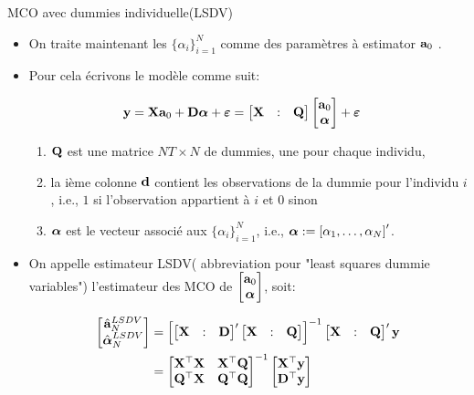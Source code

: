 \begin{frame}[allowframebreaks]{MCO avec dummies individuelle(LSDV)}
\begin{itemize}
\item On traite maintenant les $\{\alpha_i\}_{i=1}^N$ comme des paramètres à estimator ${\mathbf a}_0$ .

\item Pour cela écrivons le modèle comme suit:

\begin{align*}
{\mathbf y} &= \mathbf X{\mathbf a}_0 + \mathbf D {\boldsymbol \alpha}  + {\boldsymbol \varepsilon} =  
\begin{bmatrix}
\mathbf X&:&  \mathbf Q
\end{bmatrix}
\begin{bmatrix}
{\mathbf a}_0\\
{\boldsymbol \alpha}
\end{bmatrix} + {\boldsymbol \varepsilon}
\end{align*}
\begin{enumerate}[$\star$]
    \item $\mathbf Q$ est une matrice $N T\times N$ de dummies, une pour chaque individu,
    \item la ième colonne ${\mathbf d}$ contient les observations de la dummie pour l'individu $i$, 
    i.e., $1$ si l'observation appartient à $i$ et $0$ sinon
    \item  ${\boldsymbol \alpha}$ est le vecteur associé aux 
    $\{\alpha_i\}_{i=1}^N$, i.e., ${\boldsymbol \alpha}:=\left[\alpha_1, \ldots, \alpha_N\right]^\prime$.
\end{enumerate}
\item On appelle estimateur  LSDV( abbreviation pour "least squares dummie variables")
 l'estimateur des MCO de
$\begin{bmatrix}
{\mathbf a}_0\\
{\boldsymbol \alpha}
\end{bmatrix}$, soit:

\begin{align*}
    \begin{bmatrix}
    \hat{{\mathbf a}}^{LSDV}_N\\
    \hat{{\boldsymbol \alpha}}^{LSDV}_N
    \end{bmatrix}
    &=\left[
    \begin{bmatrix}
    \mathbf X&:&  \mathbf D
    \end{bmatrix}^\prime
    \begin{bmatrix}
    \mathbf X&:& \mathbf Q
    \end{bmatrix}\right]^{-1}
    \begin{bmatrix}
    \mathbf X&:& \mathbf Q
    \end{bmatrix}^\prime{\mathbf y}\\
    &=
    \begin{bmatrix}
    \mathbf X^\top \bold X & \mathbf X^\top\mathbf Q\\
    \mathbf Q^\top\mathbf X&\mathbf Q^\top\mathbf Q
    \end{bmatrix}^{-1}
    \begin{bmatrix}
    \mathbf X^\top{\mathbf y}\\
    \mathbf D^\top{\mathbf y}
    \end{bmatrix}
    \end{align*}
    

\end{itemize}
\end{frame}
